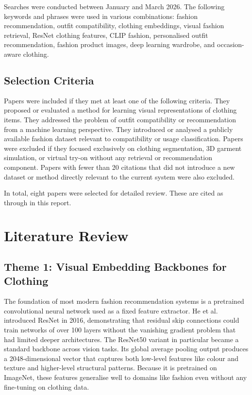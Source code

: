 \documentclass[conference]{IEEEtran}
\begin{document}
Searches were conducted between January and March 2026. The following keywords and phrases were used in various combinations: fashion recommendation, outfit compatibility, clothing embeddings, visual fashion retrieval, ResNet clothing features, CLIP fashion, personalised outfit recommendation, fashion product images, deep learning wardrobe, and occasion-aware clothing.

\subsection{Selection Criteria}

Papers were included if they met at least one of the following criteria. They proposed or evaluated a method for learning visual representations of clothing items. They addressed the problem of outfit compatibility or recommendation from a machine learning perspective. They introduced or analysed a publicly available fashion dataset relevant to compatibility or usage classification. Papers were excluded if they focused exclusively on clothing segmentation, 3D garment simulation, or virtual try-on without any retrieval or recommendation component. Papers with fewer than 20 citations that did not introduce a new dataset or method directly relevant to the current system were also excluded.

In total, eight papers were selected for detailed review. These are cited as \cite{b1} through \cite{b8} in this report.

\section{Literature Review}

\subsection{Theme 1: Visual Embedding Backbones for Clothing}

The foundation of most modern fashion recommendation systems is a pretrained convolutional neural network used as a fixed feature extractor. He et al. \cite{b1} introduced ResNet in 2016, demonstrating that residual skip connections could train networks of over 100 layers without the vanishing gradient problem that had limited deeper architectures. The ResNet50 variant in particular became a standard backbone across vision tasks. Its global average pooling output produces a 2048-dimensional vector that captures both low-level features like colour and texture and higher-level structural patterns. Because it is pretrained on ImageNet, these features generalise well to domains like fashion even without any fine-tuning on clothing data.
\end{document}
